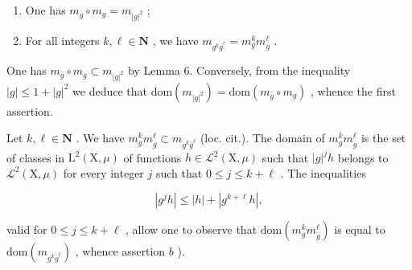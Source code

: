 \begin{enumerate}
\def\labelenumi{\alph{enumi})}
\item
  One has \(m_{\overline{g}} \circ m_g = m_{|g|^2}\) ;
\item
  For all integers \(k, \ell \in \mathbf{N}\) , we have \(m_{g^k\overline{g}^\ell} = m_g^k m_{\overline{g}}^\ell\) .
\end{enumerate}

One has \(m_{\overline{g}} \circ m_g \subset m_{|g|^2}\) by Lemma 6. Conversely, from the inequality \(|g| \leqslant 1 + |g|^2\) we deduce that \(\text{dom}(m_{|g|^2}) = \text{dom}(m_{\overline{g}} \circ m_g)\) , whence the first assertion.

Let \(k, \ell \in \mathbf{N}\) . We have \(m_g^k m_{\overline{g}}^\ell \subset m_{g^k \overline{g}^\ell}\) (loc. cit.). The domain of \(m_g^k m_{\overline{g}}^\ell\) is the set of classes in \(\mathrm{L}^2(\mathrm{X}, \mu)\) of functions \(h \in \mathcal{L}^2(\mathrm{X}, \mu)\) such that \(|g|^j h\) belongs to \(\mathcal{L}^2(\mathrm{X}, \mu)\) for every integer \(j\) such that \(0 \leqslant j \leqslant k + \ell\) . The inequalities

\[
\left| g ^ {j} h \right| \leqslant | h | + \left| g ^ {k + \ell} h \right|,
\]

valid for \(0 \leqslant j \leqslant k + \ell\) , allow one to observe that \(\mathrm{dom}(m_g^k m_{\overline{g}}^\ell)\) is equal to \(\mathrm{dom}(m_{g^k\overline{g}^\ell})\) , whence assertion \(b\) ).

